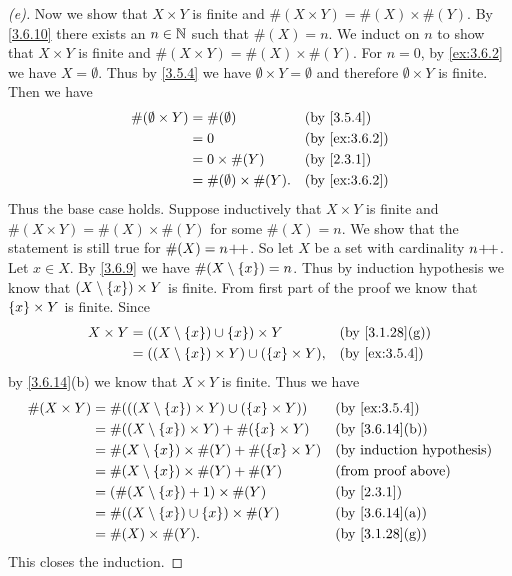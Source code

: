 \begin{proof}[(e)]
	Now we show that \(X \times Y\) is finite and \(\#(X \times Y) = \#(X) \times \#(Y)\).
	By \cref{3.6.10} there exists an \(n \in \mathbb{N}\) such that \(\#(X) = n\).
	We induct on \(n\) to show that \(X \times Y\) is finite and \(\#(X \times Y) = \#(X) \times \#(Y)\).
	For \(n = 0\), by \cref{ex:3.6.2} we have \(X = \emptyset\).
	Thus by \cref{3.5.4} we have \(\emptyset \times Y = \emptyset\) and therefore \(\emptyset \times Y\) is finite.
	Then we have
	\begin{align*}
		\#(\emptyset \times Y) & = \#(\emptyset)               &  & \by{3.5.4}    \\
		                       & = 0                           &  & \by{ex:3.6.2} \\
		                       & = 0 \times \#(Y)              &  & \by{2.3.1}    \\
		                       & = \#(\emptyset) \times \#(Y). &  & \by{ex:3.6.2}
	\end{align*}
	Thus the base case holds.
	Suppose inductively that \(X \times Y\) is finite and \(\#(X \times Y) = \#(X) \times \#(Y)\) for some \(\#(X) = n\).
	We show that the statement is still true for \(\#(X) = n\!+\!\!+\).
	So let \(X\) be a set with cardinality \(n\!+\!\!+\).
	Let \(x \in X\).
	By \cref{3.6.9} we have \(\#(X \setminus \left\lbrace x\right\rbrace) = n\).
	Thus by induction hypothesis we know that \((X \setminus \left\lbrace x\right\rbrace) \times Y\) is finite.
	From first part of the proof we know that \(\left\lbrace x\right\rbrace \times Y\) is finite.
	Since
	\begin{align*}
		X \times Y & = ((X \setminus \set{x}) \cup \set{x}) \times Y             &  & \by{3.1.28}[g] \\
		           & = ((X \setminus \set{x}) \times Y) \cup (\set{x} \times Y), &  & \by{ex:3.5.4}
	\end{align*}
	by \cref{3.6.14}(b) we know that \(X \times Y\) is finite.
	Thus we have
	\begin{align*}
		\#(X \times Y) & = \#(((X \setminus \set{x}) \times Y) \cup (\set{x} \times Y)) &  & \by{ex:3.5.4}                \\
		               & = \#((X \setminus \set{x}) \times Y) + \#(\set{x} \times Y)    &  & \text{(by \cref{3.6.14}(b))} \\
		               & = \#(X \setminus \set{x}) \times \#(Y) + \#(\set{x} \times Y)  &  & \byIH                        \\
		               & = \#(X \setminus \set{x}) \times \#(Y) + \#(Y)                 &  & \text{(from proof above)}    \\
		               & = (\#(X \setminus \set{x}) + 1) \times \#(Y)                   &  & \by{2.3.1}                   \\
		               & = \#((X \setminus \set{x}) \cup \set{x}) \times \#(Y)          &  & \text{(by \cref{3.6.14}(a))} \\
		               & = \#(X) \times \#(Y).                                          &  & \text{(by \cref{3.1.28}(g))}
	\end{align*}
	This closes the induction.
\end{proof}

